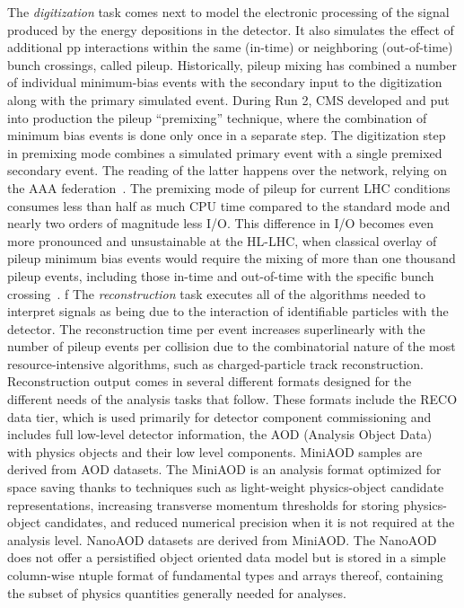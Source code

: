 \documentclass{cmspaper}
\begin{document}
The {\it digitization} task comes next to model the electronic processing of the signal produced by the energy depositions in the detector. It also simulates the effect of additional pp interactions within the same (in-time) or neighboring (out-of-time) bunch crossings, called pileup. Historically, pileup mixing has combined a number of individual minimum-bias events with the secondary input to the digitization along with the primary simulated event. During Run 2, CMS developed and put into production the pileup ``premixing'' technique, where the combination of minimum bias events is done only once in a separate step. The digitization step in premixing mode combines a simulated primary event with a single premixed secondary event. The reading of the latter happens over the network, relying on the AAA federation~\cite{Bauerdick_2014, Bauerdick:2012st}. The premixing mode of pileup for current LHC conditions consumes less than half as much CPU time compared to the standard mode and nearly two orders of magnitude less I/O. This difference in I/O  becomes even more pronounced and unsustainable at the HL-LHC, when classical overlay of pileup minimum bias events would require the mixing of more than one thousand pileup events, including those in-time and out-of-time with the specific bunch crossing~\cite{Lange_2015}.
f
The {\it reconstruction} task executes all of the algorithms needed to interpret signals as being due to the interaction of identifiable particles with the detector. The reconstruction time per event increases superlinearly with the number of pileup events per collision due to the combinatorial nature of the most resource-intensive algorithms, such as charged-particle track reconstruction. Reconstruction output comes in several different formats designed for the different needs of the analysis tasks that follow. These formats include the RECO data tier, which is used primarily for detector component commissioning and includes full low-level detector information, the AOD (Analysis Object Data) with physics objects and their low level components. MiniAOD samples are derived from AOD datasets. The MiniAOD is an analysis format optimized for space saving thanks to techniques such as light-weight physics-object candidate representations, increasing transverse momentum thresholds for storing physics-object candidates, and reduced numerical precision when it is not required at the analysis level. NanoAOD datasets are derived from MiniAOD. The NanoAOD does not offer a persistified object oriented data model but is stored in a simple column-wise ntuple format of fundamental types and arrays thereof, containing the subset of physics quantities generally needed for analyses. 
\end{document}
